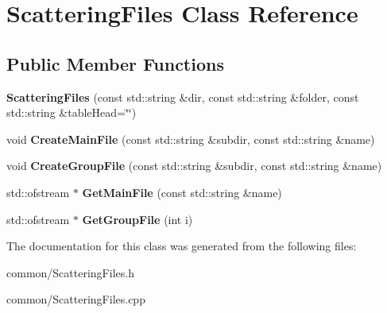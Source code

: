 \hypertarget{class_scattering_files}{}\section{Scattering\+Files Class Reference}
\label{class_scattering_files}
\subsection*{Public Member Functions}
\begin{DoxyCompactItemize}
\item 
\mbox{\label{class_scattering_files_a00914cfb3a0c6f24b02c3614defb1f2c}} 
{\bfseries Scattering\+Files} (const std\+::string \&dir, const std\+::string \&folder, const std\+::string \&table\+Head=\char`\"{}\char`\"{})
\item 
\mbox{\label{class_scattering_files_aabb3077522bad53f58e84445019f970f}} 
void {\bfseries Create\+Main\+File} (const std\+::string \&subdir, const std\+::string \&name)
\item 
\mbox{\label{class_scattering_files_ad161a18ddad23f823025ac0d532880bb}} 
void {\bfseries Create\+Group\+File} (const std\+::string \&subdir, const std\+::string \&name)
\item 
\mbox{\label{class_scattering_files_a9597afa65056d8e649a7300ca644aaff}} 
std\+::ofstream $\ast$ {\bfseries Get\+Main\+File} (const std\+::string \&name)
\item 
\mbox{\label{class_scattering_files_a18c4c365027806aa077d8f6512cf0c21}} 
std\+::ofstream $\ast$ {\bfseries Get\+Group\+File} (int i)
\end{DoxyCompactItemize}


The documentation for this class was generated from the following files\+:\begin{DoxyCompactItemize}
\item 
common/Scattering\+Files.\+h\item 
common/Scattering\+Files.\+cpp\end{DoxyCompactItemize}

